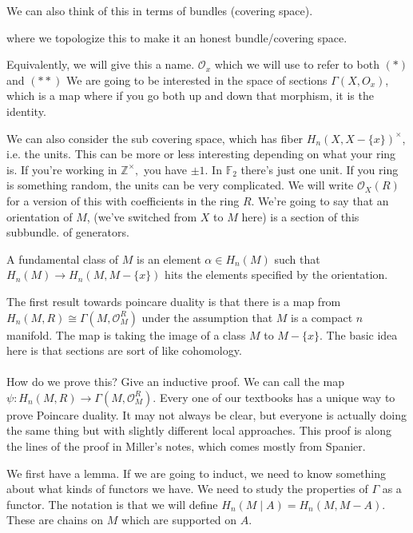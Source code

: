 \documentclass[10pt]{article}
\theoremstyle{definition}
\begin{document}
We can also think of this in terms of bundles (covering space). \begin{center}
	 where we topologize this to make it an honest bundle/covering space. 
\end{center}
Equivalently, we will give this a name. $\mathcal{O}_x$ which we will use to refer to both $(*)$ and $(**)$ We are going to be interested in the space of sections $\Gamma(X,O_x)$, which is a map where if you go both up and down that morphism, it is the identity. 

We can also consider the sub covering space, which has fiber $H_n(X,X-\{x\})^\times$, i.e. the units. This can be more or less interesting depending on what your ring is. If you're working in $\mathbb{Z}^\times, $ you have $\pm 1$. In $\mathbb{F}_2$ there's just one unit. If you ring is something random, the units can be very complicated.   We will write $\mathcal{O}_X(R)$ for a version of this with coefficients in the ring $R$. We're going to say that an orientation of $M$, (we've switched from $X$ to $M$ here) is a section of this subbundle. of generators. 

A fundamental class of $M$ is an element $\alpha \in H_n(M)$ such that $H_n(M)\to H_n(M,M-\{x\})$ hits the elements specified by the orientation. 

The first result towards poincare duality is that there is a map from $H_n(M,R)\cong \Gamma(M,\mathcal{O}_M^R)$ under the assumption that $M$ is a compact $n$ manifold. The map is taking the image of a class	 $M$ to $M-\{x\}$. The basic idea here is that sections are sort of like cohomology. 
\\\\
How do we prove this? Give an inductive proof.  We can call the map $\psi:H_n(M,R)\to \Gamma(M,\mathcal{O}_M^R)$. Every one of our textbooks has a unique way to prove Poincare duality. It may not always be clear, but everyone is actually doing the same thing but with slightly different local approaches. This proof is along the lines of the proof in Miller's notes, which comes mostly from Spanier. 

We first have a lemma. If we are going to induct, we need to know something about what kinds of functors we have. We need to study the properties of $\Gamma$ as a functor. The notation is that we will define $H_n(M\mid A)=H_n(M,M-A)$. These are chains on $M$ which are supported on $A$.  \\
\end{document}

